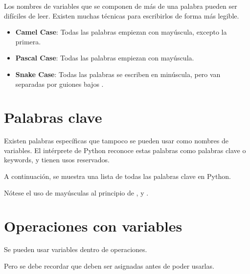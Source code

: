 Los nombres de variables que se componen de más de una palabra pueden ser difíciles de leer.
Existen muchas técnicas para escribirlos de forma más legible.

\begin{itemize}
  \item \textbf{Camel Case}: Todas las palabras empiezan con mayúscula, excepto la primera.
  

  \item \textbf{Pascal Case}: Todas las palabras empiezan con mayúscula.
  

  \item \textbf{Snake Case}: Todas las palabras se escriben en minúscula, pero van separadas por guiones bajos \ttt{\_}.
  

\end{itemize}

\section{Palabras clave}

Existen palabras específicas que tampoco se pueden usar como nombres de variables.
El intérprete de Python reconoce estas palabras como palabras clave o keywords, y tienen usos reservados.
\medskip

A continuación, se muestra una lista de todas las palabras clave en Python.


Nótese el uso de mayúsculas al principio de ,  y .

\section{Operaciones con variables}

Se pueden usar variables dentro de operaciones.


Pero se debe recordar que deben ser asignadas antes de poder usarlas.


